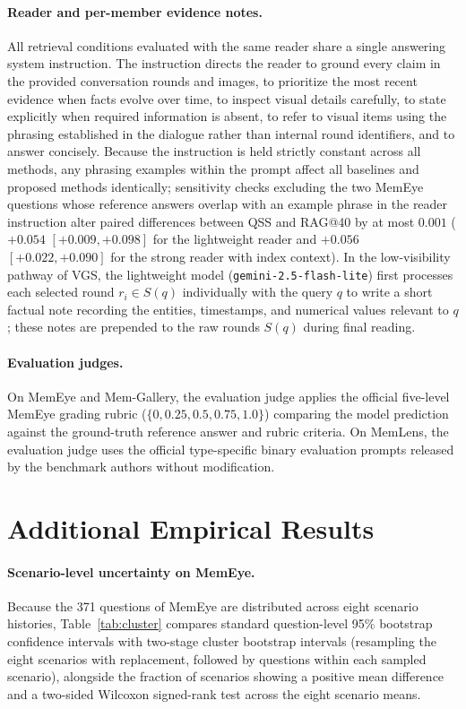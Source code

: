\documentclass[10pt]{article}
\newcommand{\qss}{QSS}
\begin{document}
\paragraph{Reader and per-member evidence notes.} All retrieval conditions evaluated with the same reader share a single answering system instruction. The instruction directs the reader to ground every claim in the provided conversation rounds and images, to prioritize the most recent evidence when facts evolve over time, to inspect visual details carefully, to state explicitly when required information is absent, to refer to visual items using the phrasing established in the dialogue rather than internal round identifiers, and to answer concisely. Because the instruction is held strictly constant across all methods, any phrasing examples within the prompt affect all baselines and proposed methods identically; sensitivity checks excluding the two MemEye questions whose reference answers overlap with an example phrase in the reader instruction alter paired differences between \qss{} and RAG@40 by at most $0.001$ ($+0.054$ $[+0.009, +0.098]$ for the lightweight reader and $+0.056$ $[+0.022, +0.090]$ for the strong reader with index context). In the low-visibility pathway of VGS, the lightweight model (\texttt{gemini-2.5-flash-lite}) first processes each selected round $r_i \in S(q)$ individually with the query $q$ to write a short factual note recording the entities, timestamps, and numerical values relevant to $q$; these notes are prepended to the raw rounds $S(q)$ during final reading.

\paragraph{Evaluation judges.} On MemEye and Mem-Gallery, the evaluation judge applies the official five-level MemEye grading rubric ($\{0, 0.25, 0.5, 0.75, 1.0\}$) comparing the model prediction against the ground-truth reference answer and rubric criteria. On MemLens, the evaluation judge uses the official type-specific binary evaluation prompts released by the benchmark authors without modification.

\section{Additional Empirical Results}
\label{app:results}

\paragraph{Scenario-level uncertainty on MemEye.} Because the 371 questions of MemEye are distributed across eight scenario histories, Table~\ref{tab:cluster} compares standard question-level 95\% bootstrap confidence intervals with two-stage cluster bootstrap intervals (resampling the eight scenarios with replacement, followed by questions within each sampled scenario), alongside the fraction of scenarios showing a positive mean difference and a two-sided Wilcoxon signed-rank test across the eight scenario means.
\end{document}
